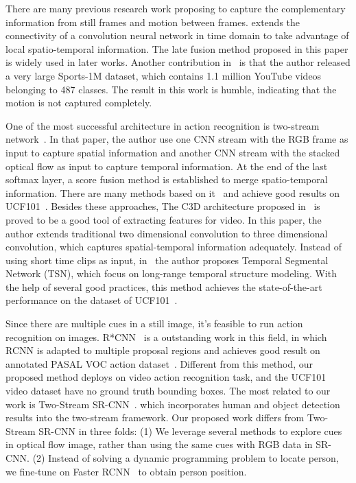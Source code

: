 \documentclass[10pt,twocolumn,letterpaper]{article}
\begin{document}
%
There are many previous research work proposing to capture the complementary information from still frames and motion between frames. \cite{karpathy2014large} extends the connectivity of a convolution neural network in time domain to take advantage of local spatio-temporal information. The late fusion method proposed in this paper is widely used in later works. Another contribution in~\cite{karpathy2014large} is that the author released a very large Sports-1M dataset, which contains 1.1 million YouTube videos belonging to 487 classes. The result in this work is humble, indicating that the motion is not captured completely. 

One of the most successful architecture in action recognition is two-stream network~\cite{simonyan2014two}. In that paper, the author use one CNN stream with the RGB frame as input to capture spatial information and another CNN stream with the stacked optical flow as input to capture temporal information. At the end of the last softmax layer, a score fusion method is established to merge spatio-temporal information. There are many methods based on it~\cite{sun2015human, WangQT15a, Feichtenhofer16, wang2016two, wang2016temporal} and achieve good results on UCF101~\cite{soomro2012ucf101}. Besides these approaches,  The C3D architecture proposed in~\cite{Tran_2015_ICCV} is proved to be a good tool of extracting features for video.  In this paper, the author extends traditional two dimensional convolution to three dimensional convolution, which captures spatial-temporal information adequately. Instead of using short time clips as input, in~\cite{wang2016temporal} the author proposes Temporal Segmental Network (TSN), which focus on  long-range temporal structure modeling. With the help of several good practices, this method achieves the state-of-the-art performance on the dataset of UCF101~\cite{soomro2012ucf101}. 

Since there are multiple cues in a still image, it's feasible to run action recognition on images. R*CNN~\cite{gkioxari2015contextual} is a outstanding work in this field, in which RCNN is adapted to multiple proposal regions and achieves good result on annotated PASAL VOC action dataset~\cite{everingham2010pascal}. Different from this method, our proposed method deploys on video action recognition task, and the UCF101 video dataset have no ground truth bounding boxes. 
The most related to our work is Two-Stream SR-CNN~\cite{wang2016two}. which incorporates human and object detection results into the two-stream framework. Our proposed work differs from Two-Stream SR-CNN in three folds: (1) We leverage several methods to 
explore cues in optical flow image, rather than using the same cues with RGB data in SR-CNN. (2) Instead of solving a dynamic programming problem to locate person, we fine-tune on Faster RCNN~\cite{ren2015faster} to obtain person position.
\end{document}

